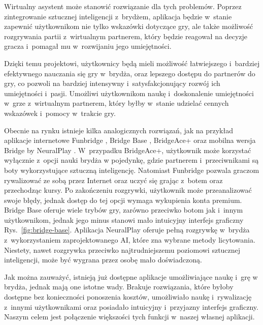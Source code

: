 Wirtualny asystent może stanowić rozwiązanie dla tych problemów. Poprzez
zintegrowanie sztucznej inteligencji z~brydżem, aplikacja będzie w~stanie
zapewnić użytkownikom nie tylko wskazówki dotyczące gry, ale także możliwość
rozgrywania partii z~wirtualnym partnerem, który będzie reagował na decyzje
gracza i~pomagał mu w~rozwijaniu jego umiejętności.

Dzięki temu projektowi, użytkownicy będą mieli możliwość łatwiejszego i~bardziej
efektywnego nauczania się gry w~brydża, oraz lepszego dostępu do partnerów
do gry, co pozwoli na bardziej intensywny i~satysfakcjonujący rozwój ich
umiejętności i~pasji. Umożliwi użytkownikom naukę i~doskonalenie umiejętności
w~grze z~wirtualnym partnerem, który byłby w~stanie udzielać cennych
wskazówek i~pomocy w~trakcie gry.
\newline

Obecnie na rynku istnieje kilka analogicznych rozwiązań, jak na przykład
aplikacje internetowe Funbridge \cite{funbridge}, Bridge Base \cite{bridgebase},
BridgeAce+ \cite{bridgeace} oraz mobilna wersja Bridge by NeuralPlay
\cite{neuralplay}. W~przypadku BridgeAce+, użytkownik może korzystać wyłącznie
z~opcji nauki brydża w pojedynkę, gdzie partnerem i~przeciwnikami są boty
wykorzystujące sztuczną inteligencję. Natomiast Funbridge pozwala graczom
rywalizować ze sobą przez Internet oraz uczyć się grając z~botem oraz
przechodząc kursy. Po zakończeniu rozgrywki, użytkownik może przeanalizować
swoje błędy, jednak dostęp do tej opcji wymaga wykupienia konta premium.
Bridge Base oferuje wiele trybów gry, zarówno przeciwko botom jak i~innym
użytkownikom, jednak jego minus stanowi mało intuicyjny interfejs graficzny
Rys.~\ref{fig:bridge-base}. Aplikacja NeuralPlay oferuje pełną rozgrywkę w~brydża
z~wykorzystaniem zaprojektowanego AI, które zna wybrane metody licytowania.
Niestety, nawet rozgrywka przeciwko najtrudniejszemu poziomowi sztucznej
inteligencji, może być wygrana przez osobę mało doświadczoną.
\newline

Jak można zauważyć, istnieją już dostępne aplikacje umożliwiające naukę
i~grę w brydża, jednak mają one istotne wady. Brakuje rozwiązania, które
byłoby dostępne bez konieczności ponoszenia kosztów, umożliwiało naukę
i~rywalizację z~innymi użytkownikami oraz posiadało intuicyjny i~przyjazny
interfejs graficzny. Naszym celem jest połączenie większości tych funkcji
w~naszej własnej aplikacji.



\FloatBarrier

